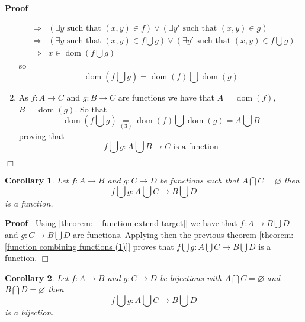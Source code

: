 \documentclass{book}
\newcommand{\equallim}{\mathop{=}\limits}
\newcommand{\tmop}[1]{\ensuremath{\operatorname{#1}}}
\newenvironment{proof}{\noindent\textbf{Proof\ }}{\hspace*{\fill}$\Box$\medskip}
\newtheorem{corollary}{Corollary}
\begin{document}
\begin{proof}
\begin{enumerate}
\begin{eqnarray*}
      & \Rightarrow & \left( \exists y \text{ such that } (x, y) \in f
      \right) \vee \left( \exists y' \text{ such that } (x, y) \in g \right)\\
      & \Rightarrow & \left( \exists y \text{ such that } (x, y) \in f
      \bigcup g \right) \vee \left( \exists y' \text{ such that } (x, y) \in f
      \bigcup g \right)\\
      & \Rightarrow & x \in \tmop{dom} \left( f \bigcup g \right)
    \end{eqnarray*}
    so
    \[ \tmop{dom} \left( f \bigcup g \right) = \tmop{dom} (f) \bigcup
       \tmop{dom} (g) \]
    \item As $f : A \rightarrow C$ and $g : B \rightarrow C$ are functions we
    have that $A = \tmop{dom} (f)$, $B = \tmop{dom} (g)$. So that
    \[ \tmop{dom} \left( f \bigcup g \right) \equallim_{(3)} \tmop{dom} (f)
       \bigcup \tmop{dom} (g) = A \bigcup B \]
    proving that
    \[ f \bigcup g : A \bigcup B \rightarrow C \text{ is a function} \]
  \end{enumerate}
\end{proof}

\begin{corollary}
  \label{function combining functions (2)}Let $f : A \rightarrow B$ and $g : C
  \rightarrow D$ be functions such that $A \bigcap C = \varnothing$ then
  \[ f \bigcup g : A \bigcup C \rightarrow B \bigcup D \]
  is a function.
\end{corollary}

\begin{proof}
  Using [theorem: \ \ref{function extend target}] we have that $f : A
  \rightarrow B \bigcup D$ and $g : C \rightarrow B \bigcup D$ are functions.
  Applying then the previous theorem [theorem: \ref{function combining
  functions (1)}] proves that $f \bigcup g : A \bigcup C \rightarrow B \bigcup
  D$ is a function.
\end{proof}

\begin{corollary}
  \label{function combining bijections}Let $f : A \rightarrow B$ and $g : C
  \rightarrow D$ be bijections with $A \bigcap C = \varnothing$ and $B \bigcap
  D = \varnothing$ then
  \[ f \bigcup g : A \bigcup C \rightarrow B \bigcup D \]
  is a bijection.
\end{corollary}
\end{document}
